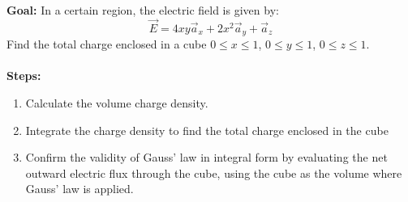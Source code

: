 \documentclass[../../header.tex]{subfiles}
\begin{document}
\textbf{Goal:}  In a certain region, the	electric field is given by:
\begin{equation*}
	\vec{E} = 4 x y \vec{a}_x + 2 x^2 \vec{a}_y + \vec{a}_z
\end{equation*}
Find the total charge enclosed in a cube $0 \leq x \leq 1$, $0 \leq y \leq 1$, $ 0 \leq z \leq 1$.
\\
\\
\textbf{Steps:}
	\begin{enumerate}
		\item Calculate the volume charge density.\\
		
		\item Integrate the charge density to find the total charge enclosed in the cube\\
		
		\item Confirm the validity of Gauss’ law in integral form by evaluating the net outward electric flux through the cube, using the cube as the volume where Gauss’ law is applied.\\
	\end{enumerate}
\end{document}
